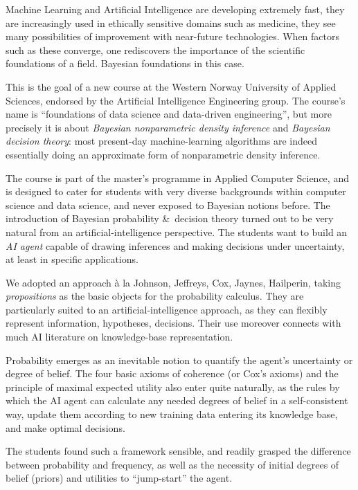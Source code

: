 Machine Learning and Artificial Intelligence are developing extremely fast, they are increasingly used in ethically sensitive domains such as medicine, they see many possibilities of improvement with near-future technologies. When factors such as these converge, one rediscovers the importance of the scientific foundations of a field. Bayesian foundations in this case.

This is the goal of a new course at the Western Norway University of Applied Sciences, endorsed by the Artificial Intelligence Engineering group. The course's name is ``foundations of data science and data-driven engineering'', but more precisely it is about \emph{Bayesian nonparametric density inference} and \emph{Bayesian decision theory}: most present-day machine-learning algorithms are indeed essentially doing an approximate form of nonparametric density inference.

The course is part of the master's programme in Applied Computer Science, and is designed to cater for students with very diverse backgrounds within computer science and data science, and never exposed to Bayesian notions before. %
The introduction of Bayesian probability \&\ decision theory turned out to be very natural from an artificial-intelligence perspective. The students want to build an \emph{AI agent} capable of drawing inferences and making decisions under uncertainty, at least in specific applications.

We adopted an approach à la Johnson, Jeffreys, Cox, Jaynes, Hailperin, taking \emph{propositions} as the basic objects for the probability calculus. They are particularly suited to an artificial-intelligence approach, as they can flexibly represent information, hypotheses, decisions. Their use moreover connects with much AI literature on knowledge-base representation.

Probability emerges as an inevitable notion to quantify the agent's uncertainty or degree of belief. The four basic axioms of coherence (or Cox's axioms) and the principle of maximal expected utility also enter quite naturally, as the rules by which the AI agent can calculate any needed degrees of belief in a self-consistent way, update them according to new training data entering its knowledge base, and make optimal decisions.

The students found such a framework sensible, and readily grasped the difference between probability and frequency, as well as the necessity of initial degrees of belief (priors) and utilities to ``jump-start'' the agent.

